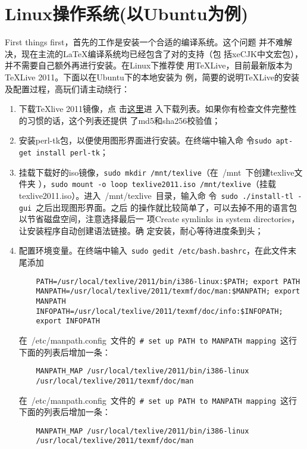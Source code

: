 \section{Linux操作系统(以Ubuntu为例)}
First things first，首先的工作是安装一个合适的\XeTeX{}编译系统。这个问题
并不难解决，现在主流的\LaTeX{}编译系统均已经包含了对\XeTeX{}的支持（包
括xeCJK中文宏包），并不需要自己额外再进行安装。在Linux下推荐使
用\TeX{}Live，目前最新版本为\TeX{}Live 2011。下面以在Ubuntu下的本地安装为
例，简要的说明\TeX{}Live的安装及配置过程，高玩们请主动绕行：
\begin{enumerate}
\item 下载\TeX{}live 2011镜像，点
  击\href{http://ftp.ctex.org/mirrors/CTAN/systems/texlive/Images/}{这里}进
  入下载列表。如果你有检查文件完整性的习惯的话，这个列表还提供
  了md5和sha256校验值；
\item 安装perl-tk包，以便使用图形界面进行安装。在终端中输入命
  令\texttt{\footnotesize sudo apt-get install perl-tk}；
\item 挂载下载好的iso镜像，\texttt{\footnotesize sudo mkdir
    /mnt/texlive}（在~{/mnt}~下创建texlive文件夹
  ），\texttt{\footnotesize sudo mount -o loop texlive2011.iso
    /mnt/texlive}（挂载texlive2011.iso）。进入~/mnt/texlive~目录，输入命
  令~\texttt{\footnotesize sudo ./install-tl -gui}~之后出现图形界面。之后
  的操作就比较简单了，可以去掉不用的语言包以节省磁盘空间，注意选择最后一
  项Create symlinks in system directories，让安装程序自动创建语法链接。确
  定安装，耐心等待进度条到头；
\item 配置环境变量。在终端中输入~\texttt{\footnotesize sudo gedit
    /etc/bash.bashrc}，在此文件末尾添加
  \begin{lstlisting}
    PATH=/usr/local/texlive/2011/bin/i386-linux:$PATH; export PATH
    MANPATH=/usr/local/texlive/2011/texmf/doc/man:$MANPATH; export
    MANPATH
    INFOPATH=/usr/local/texlive/2011/texmf/doc/info:$INFOPATH;
    export INFOPATH
  \end{lstlisting}
  在~{/etc/manpath.config}~文件的~\texttt{\footnotesize\# set up PATH to
    MANPATH mapping}~这行下面的列表后增加一条：
  \begin{lstlisting}
    MANPATH_MAP /usr/local/texlive/2011/bin/i386-linux
    /usr/local/texlive/2011/texmf/doc/man
  \end{lstlisting}
  在~{/etc/manpath.config}~文件的~\texttt{\footnotesize\# set up PATH to
    MANPATH mapping}~这行下面的列表后增加一条：
  \begin{lstlisting}
    MANPATH_MAP /usr/local/texlive/2011/bin/i386-linux
    /usr/local/texlive/2011/texmf/doc/man
  \end{lstlisting}
\end{enumerate}

